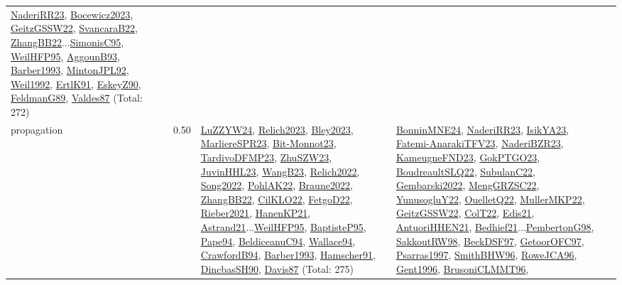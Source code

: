 {\begin{longtable}{p{3cm}r>{\raggedright\arraybackslash}p{6cm}>{\raggedright\arraybackslash}p{6cm}>{\raggedright\arraybackslash}p{8cm}}
\hyperref[detail:NaderiRR23]{NaderiRR23}, \hyperref[detail:Bocewicz2023]{Bocewicz2023}, \hyperref[detail:GeitzGSSW22]{GeitzGSSW22}, \hyperref[detail:SvancaraB22]{SvancaraB22}, \hyperref[detail:ZhangBB22]{ZhangBB22}...\hyperref[detail:SimonisC95]{SimonisC95}, \hyperref[detail:WeilHFP95]{WeilHFP95}, \hyperref[detail:AggounB93]{AggounB93}, \hyperref[detail:Barber1993]{Barber1993}, \hyperref[detail:MintonJPL92]{MintonJPL92}, \hyperref[detail:Weil1992]{Weil1992}, \hyperref[detail:ErtlK91]{ErtlK91}, \hyperref[detail:EskeyZ90]{EskeyZ90}, \hyperref[detail:FeldmanG89]{FeldmanG89}, \hyperref[detail:Valdes87]{Valdes87} (Total: 272)\\
\index{propagation}\index{CP!propagation}propagation &  0.50 & \hyperref[detail:LuZZYW24]{LuZZYW24}, \hyperref[detail:Relich2023]{Relich2023}, \hyperref[detail:Bley2023]{Bley2023}, \hyperref[detail:MarliereSPR23]{MarliereSPR23}, \hyperref[detail:Bit-Monnot23]{Bit-Monnot23}, \hyperref[detail:TardivoDFMP23]{TardivoDFMP23}, \hyperref[detail:ZhuSZW23]{ZhuSZW23}, \hyperref[detail:JuvinHHL23]{JuvinHHL23}, \hyperref[detail:WangB23]{WangB23}, \hyperref[detail:Relich2022]{Relich2022}, \hyperref[detail:Song2022]{Song2022}, \hyperref[detail:PohlAK22]{PohlAK22}, \hyperref[detail:Braune2022]{Braune2022}, \hyperref[detail:ZhangBB22]{ZhangBB22}, \hyperref[detail:CilKLO22]{CilKLO22}, \hyperref[detail:FetgoD22]{FetgoD22}, \hyperref[detail:Rieber2021]{Rieber2021}, \hyperref[detail:HanenKP21]{HanenKP21}, \hyperref[detail:Astrand21]{Astrand21}...\hyperref[detail:WeilHFP95]{WeilHFP95}, \hyperref[detail:BaptisteP95]{BaptisteP95}, \hyperref[detail:Pape94]{Pape94}, \hyperref[detail:BeldiceanuC94]{BeldiceanuC94}, \hyperref[detail:Wallace94]{Wallace94}, \hyperref[detail:CrawfordB94]{CrawfordB94}, \hyperref[detail:Barber1993]{Barber1993}, \hyperref[detail:Hamscher91]{Hamscher91}, \hyperref[detail:DincbasSH90]{DincbasSH90}, \hyperref[detail:Davis87]{Davis87} (Total: 275) & \hyperref[detail:BonninMNE24]{BonninMNE24}, \hyperref[detail:NaderiRR23]{NaderiRR23}, \hyperref[detail:IsikYA23]{IsikYA23}, \hyperref[detail:Fatemi-AnarakiTFV23]{Fatemi-AnarakiTFV23}, \hyperref[detail:NaderiBZR23]{NaderiBZR23}, \hyperref[detail:KameugneFND23]{KameugneFND23}, \hyperref[detail:GokPTGO23]{GokPTGO23}, \hyperref[detail:BoudreaultSLQ22]{BoudreaultSLQ22}, \hyperref[detail:SubulanC22]{SubulanC22}, \hyperref[detail:Gembarski2022]{Gembarski2022}, \hyperref[detail:MengGRZSC22]{MengGRZSC22}, \hyperref[detail:YunusogluY22]{YunusogluY22}, \hyperref[detail:OuelletQ22]{OuelletQ22}, \hyperref[detail:MullerMKP22]{MullerMKP22}, \hyperref[detail:GeitzGSSW22]{GeitzGSSW22}, \hyperref[detail:ColT22]{ColT22}, \hyperref[detail:Edis21]{Edis21}, \hyperref[detail:AntuoriHHEN21]{AntuoriHHEN21}, \hyperref[detail:Bedhief21]{Bedhief21}...\hyperref[detail:PembertonG98]{PembertonG98}, \hyperref[detail:SakkoutRW98]{SakkoutRW98}, \hyperref[detail:BeckDSF97]{BeckDSF97}, \hyperref[detail:GetoorOFC97]{GetoorOFC97}, \hyperref[detail:Psarras1997]{Psarras1997}, \hyperref[detail:SmithBHW96]{SmithBHW96}, \hyperref[detail:RoweJCA96]{RoweJCA96}, \hyperref[detail:Gent1996]{Gent1996}, \hyperref[detail:BrusoniCLMMT96]{BrusoniCLMMT96}, 
\end{longtable}}

